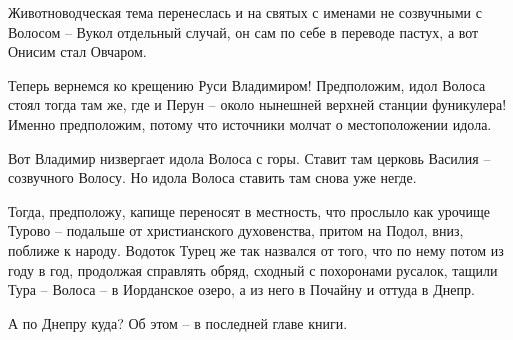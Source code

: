     Животноводческая тема перенеслась и на святых с именами не созвучными с Волосом – Вукол отдельный случай, он сам по себе в переводе пастух, а вот Онисим стал Овчаром.

   Теперь вернемся ко крещению Руси Владимиром! Предположим, идол Волоса стоял тогда там же, где и Перун – около нынешней верхней станции фуникулера! Именно предположим, потому что источники молчат о местоположении идола.

   Вот Владимир низвергает идола Волоса с горы. Ставит там церковь Василия – созвучного Волосу. Но идола Волоса ставить там снова уже негде.

   Тогда, предположу, капище переносят в местность, что прослыло как урочище Турово – подальше от христианского духовенства, притом на Подол, вниз, поближе к народу. Водоток Турец же так назвался от того, что по нему потом из году в год, продолжая справлять обряд, сходный с похоронами русалок, тащили Тура – Волоса – в Иорданское озеро, а из него в Почайну и оттуда в Днепр.

   А по Днепру куда? Об этом – в последней главе книги.
